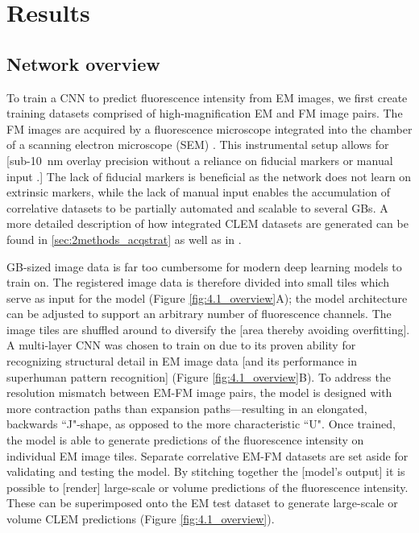\section{Results}
\label{sec:4.2_results}

\subsection{Network overview}
\label{sec:4results_overview}

To train a CNN to predict fluorescence intensity from EM images, we first create training datasets comprised of high-magnification EM and FM image pairs. The FM images are acquired by a fluorescence microscope integrated into the chamber of a scanning electron microscope (SEM) \cite{liv2013simultaneous, zonnevylle2013integration}. This instrumental setup allows for [sub-\SI{10}{\nano\meter} overlay precision without a reliance on fiducial markers or manual input \cite{haring2017automated}.] The lack of fiducial markers is beneficial as the network does not learn on extrinsic markers, while the lack of manual input enables the accumulation of correlative datasets to be partially automated and scalable to several GBs. A more detailed description of how integrated CLEM datasets are generated can be found in \ref{sec:2methods_acqstrat} as well as in \textcite{lane2021optimization}.

GB-sized image data is far too cumbersome for modern deep learning models to train on. The registered image data is therefore divided into small tiles which serve as input for the model (Figure \ref{fig:4.1_overview}A); the model architecture can be adjusted to support an arbitrary number of fluorescence channels. The image tiles are shuffled around to diversify the [area thereby avoiding overfitting]. A multi-layer CNN was chosen to train on due to its proven ability for recognizing structural detail in EM image data [and its performance in superhuman pattern recognition] (Figure \ref{fig:4.1_overview}B). To address the resolution mismatch between EM-FM image pairs, the model is designed with more contraction paths than expansion paths---resulting in an elongated, backwards ``J"-shape, as opposed to the more characteristic ``U". Once trained, the model is able to generate predictions of the fluorescence intensity on individual EM image tiles. Separate correlative EM-FM datasets are set aside for validating and testing the model. By stitching together the [model's output] it is possible to [render] large-scale or volume predictions of the fluorescence intensity. These can be superimposed onto the EM test dataset to generate large-scale or volume CLEM predictions (Figure \ref{fig:4.1_overview}).

